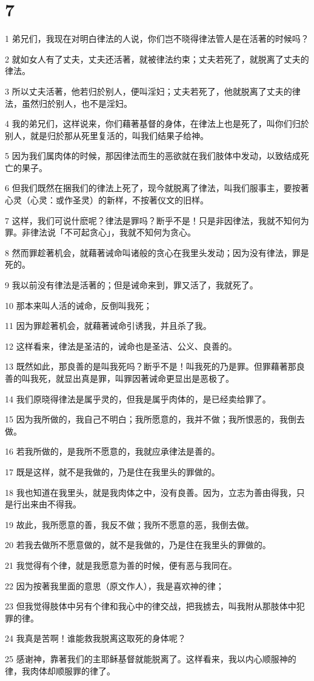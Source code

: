 \chapter{7}

\par 1 弟兄们，我现在对明白律法的人说，你们岂不晓得律法管人是在活著的时候吗？
\par 2 就如女人有了丈夫，丈夫还活著，就被律法约束；丈夫若死了，就脱离了丈夫的律法。
\par 3 所以丈夫活著，他若归於别人，便叫淫妇；丈夫若死了，他就脱离了丈夫的律法，虽然归於别人，也不是淫妇。
\par 4 我的弟兄们，这样说来，你们藉著基督的身体，在律法上也是死了，叫你们归於别人，就是归於那从死里复活的，叫我们结果子给神。
\par 5 因为我们属肉体的时候，那因律法而生的恶欲就在我们肢体中发动，以致结成死亡的果子。
\par 6 但我们既然在捆我们的律法上死了，现今就脱离了律法，叫我们服事主，要按著心灵（心灵：或作圣灵）的新样，不按著仪文的旧样。
\par 7 这样，我们可说什麽呢？律法是罪吗？断乎不是！只是非因律法，我就不知何为罪。非律法说「不可起贪心」，我就不知何为贪心。
\par 8 然而罪趁著机会，就藉著诫命叫诸般的贪心在我里头发动；因为没有律法，罪是死的。
\par 9 我以前没有律法是活著的；但是诫命来到，罪又活了，我就死了。
\par 10 那本来叫人活的诫命，反倒叫我死；
\par 11 因为罪趁著机会，就藉著诫命引诱我，并且杀了我。
\par 12 这样看来，律法是圣洁的，诫命也是圣洁、公义、良善的。
\par 13 既然如此，那良善的是叫我死吗？断乎不是！叫我死的乃是罪。但罪藉著那良善的叫我死，就显出真是罪，叫罪因著诫命更显出是恶极了。
\par 14 我们原晓得律法是属乎灵的，但我是属乎肉体的，是已经卖给罪了。
\par 15 因为我所做的，我自己不明白；我所愿意的，我并不做；我所恨恶的，我倒去做。
\par 16 若我所做的，是我所不愿意的，我就应承律法是善的。
\par 17 既是这样，就不是我做的，乃是住在我里头的罪做的。
\par 18 我也知道在我里头，就是我肉体之中，没有良善。因为，立志为善由得我，只是行出来由不得我。
\par 19 故此，我所愿意的善，我反不做；我所不愿意的恶，我倒去做。
\par 20 若我去做所不愿意做的，就不是我做的，乃是住在我里头的罪做的。
\par 21 我觉得有个律，就是我愿意为善的时候，便有恶与我同在。
\par 22 因为按著我里面的意思（原文作人），我是喜欢神的律；
\par 23 但我觉得肢体中另有个律和我心中的律交战，把我掳去，叫我附从那肢体中犯罪的律。
\par 24 我真是苦啊！谁能救我脱离这取死的身体呢？
\par 25 感谢神，靠著我们的主耶稣基督就能脱离了。这样看来，我以内心顺服神的律，我肉体却顺服罪的律了。

